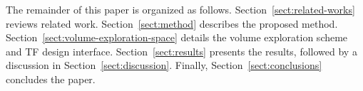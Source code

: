 The remainder of this paper is organized as follows. Section~\ref{sect:related-works} reviews related work. Section~\ref{sect:method} describes the proposed method. Section~\ref{sect:volume-exploration-space} details the volume exploration scheme and TF design interface. Section~\ref{sect:results} presents the results, followed by a discussion in Section~\ref{sect:discussion}. Finally, Section~\ref{sect:conclusions} concludes the paper.
